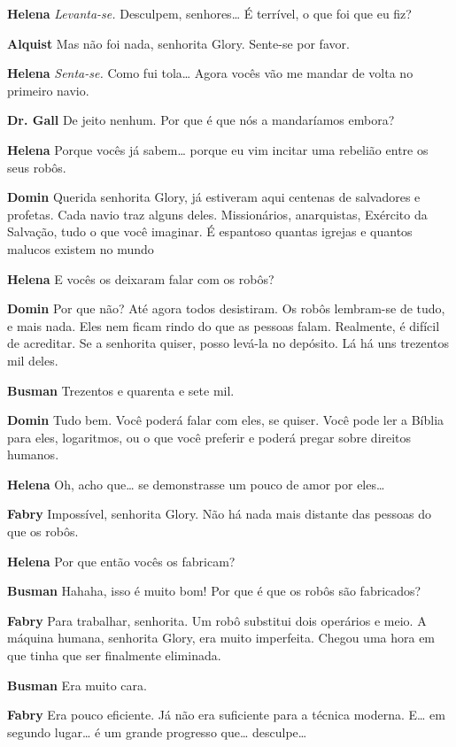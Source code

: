 \textbf{Helena} \emph{Levanta-se.} Desculpem, senhores\ldots{} É terrível,
o que foi que eu fiz?

\textbf{Alquist} Mas não foi nada, senhorita Glory. Sente-se por favor.

\textbf{Helena} \emph{Senta-se.} Como fui tola\ldots{} Agora vocês vão me
mandar de volta no primeiro navio.

\textbf{Dr. Gall} De jeito nenhum. Por que é que nós a mandaríamos embora?

\textbf{Helena} Porque vocês já sabem\ldots{} porque eu vim incitar uma rebelião entre os seus robôs.

\textbf{Domin} Querida senhorita Glory, já estiveram aqui centenas de salvadores e
profetas. Cada navio traz alguns deles. Missionários, anarquistas, Exército da
Salvação, tudo o que você imaginar. É espantoso quantas igrejas e quantos malucos existem
no mundo

\textbf{Helena} E vocês os deixaram falar com os robôs?

\textbf{Domin} Por que não? Até agora todos desistiram. Os robôs lembram-se de tudo, e
mais nada. Eles nem ficam rindo do que as pessoas falam. Realmente, é
difícil de acreditar. Se a senhorita quiser, posso levá-la no depósito. Lá há uns
trezentos mil deles.

\textbf{Busman} Trezentos e quarenta e sete mil.

\textbf{Domin} Tudo bem. Você poderá falar com eles, se quiser. Você pode ler a Bíblia
para eles, logaritmos, ou o que você preferir e poderá pregar sobre direitos humanos.

\textbf{Helena} Oh, acho que\ldots{} se demonstrasse um pouco de amor por eles\ldots{}

\textbf{Fabry} Impossível, senhorita Glory. Não há nada mais distante das pessoas do que
os robôs.

\textbf{Helena} Por que então vocês os fabricam?

\textbf{Busman} Hahaha, isso é muito bom! Por que é que os robôs são fabricados?

\textbf{Fabry} Para trabalhar, senhorita. Um robô substitui dois operários e meio. A
máquina humana, senhorita Glory, era muito imperfeita. Chegou uma hora em que
tinha que ser finalmente eliminada.

\textbf{Busman} Era muito cara.

\textbf{Fabry} Era pouco eficiente. Já não era suficiente para a técnica moderna. E\ldots{}
em segundo lugar\ldots{} é um grande progresso que\ldots{} desculpe\ldots{}

